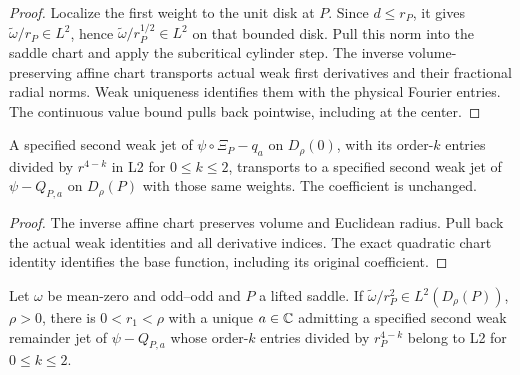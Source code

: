 \begin{proof}
\leanok
Localize the first weight to the unit disk at $P$. Since $d\le r_P$,
it gives $\widetilde\omega/r_P\in L^2$, hence
$\widetilde\omega/r_P^{1/2}\in L^2$ on that bounded disk.
Pull this norm into the saddle chart and apply the subcritical cylinder step.
The inverse volume-preserving affine chart transports actual weak first
derivatives and their fractional radial norms. Weak uniqueness identifies
them with the physical Fourier entries. The continuous value bound pulls
back pointwise, including at the center.
\end{proof}

\begin{lemma}
\label{lem:saddle-remainder-jet-pushforward}
\leanok
A specified second weak jet of $\psi\circ\Xi_P-q_a$ on $D_\rho(0)$,
with its order-$k$ entries divided by $r^{4-k}$ in L2 for $0\le k\le2$,
transports to a specified second weak jet of $\psi-Q_{P,a}$ on
$D_\rho(P)$ with those same weights. The coefficient is unchanged.
\end{lemma}

\begin{proof}
\leanok
The inverse affine chart preserves volume and Euclidean radius.
Pull back the actual weak identities and all derivative indices.
The exact quadratic chart identity identifies the base function, including
its original coefficient.
\end{proof}

\begin{lemma}
\label{lem:dd-saddle-jet-from-radial-vorticity}
\leanok
Let $\omega$ be mean-zero and odd--odd and $P$ a lifted saddle.
If $\widetilde\omega/r_P^2\in L^2(D_\rho(P))$, $\rho>0$, there is
$0<r_1<\rho$ with a unique $a\in\mathbb{C}$ admitting a specified second weak
remainder jet of $\psi-Q_{P,a}$ whose order-$k$ entries divided by
$r_P^{4-k}$ belong to L2 for $0\le k\le2$.
\end{lemma}

